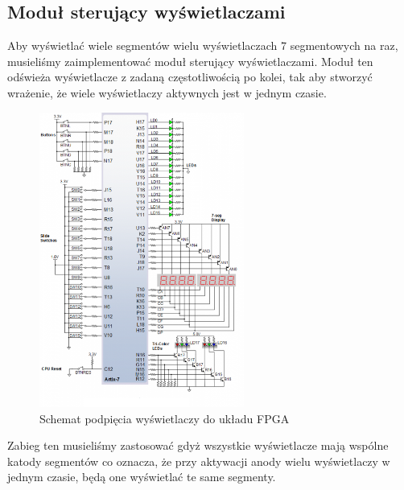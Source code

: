 \documentclass[a4paper]{article}
\begin{document}
\pagebreak
\subsection{Moduł sterujący wyświetlaczami}
Aby wyświetlać wiele segmentów wielu wyświetlaczach 7 segmentowych na raz,
musieliśmy zaimplementować moduł sterujący wyświetlaczami. Moduł ten 
odświeża wyświetlacze z zadaną częstotliwością po kolei, tak aby 
stworzyć wrażenie, że wiele wyświetlaczy aktywnych jest w jednym czasie.

\begin{figure}[H]
    \centering
    \includegraphics[width=0.6\textwidth]{fpga_led_diagram.png}
    \caption{Schemat podpięcia wyświetlaczy do układu FPGA}
\end{figure}

Zabieg ten musieliśmy zastosować gdyż wszystkie wyświetlacze 
mają wspólne katody segmentów co oznacza, że przy aktywacji 
anody wielu wyświetlaczy w jednym czasie, będą one wyświetlać te same 
segmenty.
\end{document}
